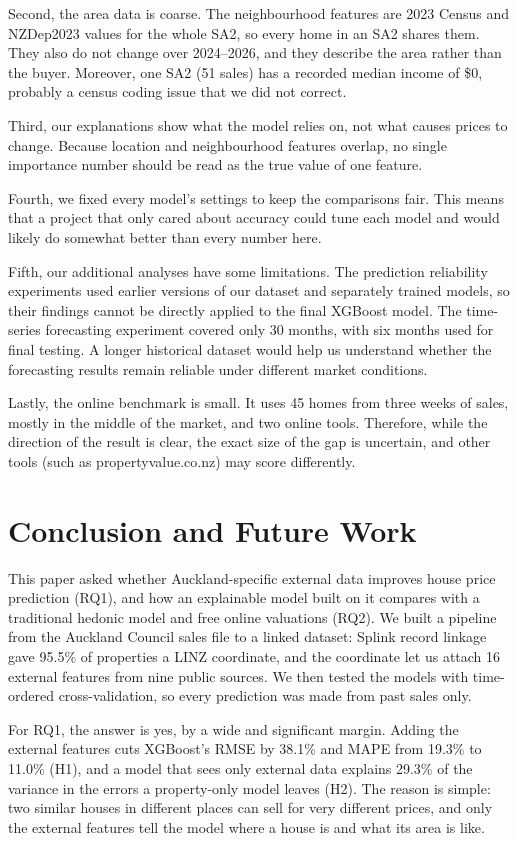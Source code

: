 \documentclass[conference]{IEEEtran}
\begin{document}
Second, the area data is coarse. The neighbourhood features are 2023
Census and NZDep2023 values for the whole SA2, so every home in an SA2
shares them. They also do not change over 2024--2026, and they describe
the area rather than the buyer. Moreover, one SA2 (51 sales) has a
recorded median income of \$0, probably a census coding issue that we
did not correct.

Third, our explanations show what the model relies on, not what causes
prices to change. Because location and neighbourhood features overlap,
no single importance number should be read as the true value of one
feature.

Fourth, we fixed every model's settings to keep the comparisons fair.
This means that a project that only cared about accuracy could tune each
model and would likely do somewhat better than every number here.

Fifth, our additional analyses have some limitations. The prediction
reliability experiments used earlier versions of our dataset and
separately trained models, so their findings cannot be directly applied
to the final XGBoost model. The time-series forecasting experiment
covered only 30 months, with six months used for final testing. A longer
historical dataset would help us understand whether the forecasting
results remain reliable under different market conditions.

Lastly, the online benchmark is small. It uses 45 homes from three
weeks of sales, mostly in the middle of the market, and two online
tools. Therefore, while the direction of the result is clear, the exact
size of the gap is uncertain, and other tools (such as
propertyvalue.co.nz) may score differently.

\section{Conclusion and Future Work}\label{sec:conclusion}
This paper asked whether Auckland-specific external data improves house
price prediction (RQ1), and how an explainable model built on it compares
with a traditional hedonic model and free online valuations (RQ2). We
built a pipeline from the Auckland Council sales file to a linked
dataset: Splink record linkage gave 95.5\% of properties a LINZ
coordinate, and the coordinate let us attach 16 external features from
nine public sources. We then tested the models with time-ordered cross-validation,
so every prediction was made from past sales only.

For RQ1, the answer is yes, by a wide and significant margin. Adding the
external features cuts XGBoost's RMSE by 38.1\% and MAPE from 19.3\% to
11.0\% (H1), and a model that sees only external data explains 29.3\% of
the variance in the errors a property-only model leaves (H2). The reason
is simple: two similar houses in different places can sell for very
different prices, and only the external features tell the model where a
house is and what its area is like.
\end{document}
